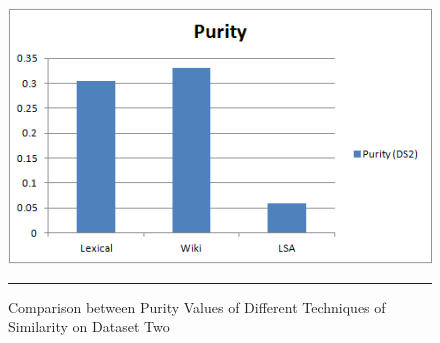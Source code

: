 \begin{figure}[htbp]
	\centering
		\includegraphics{./Figures/Purity_DS2.png}
		\rule{35em}{0.5pt}
	\caption[Comparison between Purity Values of Different Techniques of Similarity on Dataset Two]{Comparison between Purity Values of Different Techniques of Similarity on Dataset Two}
	\label{fig:F11}
\end{figure}


